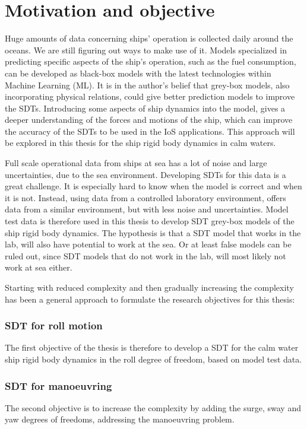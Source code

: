 \section{Motivation and objective}
\label{sec:motivation}
Huge amounts of data concerning ships' operation is collected daily around the oceans. We are still figuring out ways to make use of it. Models specialized in predicting specific aspects of the ship's operation, such as the fuel consumption, can be developed as black-box models with the latest technologies within Machine Learning (ML). It is in the author's belief that grey-box models, also incorporating physical relations, could give better prediction models to improve the SDTs. Introducing some aspects of ship dynamics into the model, gives a deeper understanding of the forces and motions of the ship, which can improve the accuracy of the SDTs to be used in the IoS applications. This approach will be explored in this thesis for the ship rigid body dynamics in calm waters.

Full scale operational data from ships at sea has a lot of noise and large uncertainties, due to the sea environment. Developing SDTs for this data is a great challenge. It is especially hard to know when the model is correct and when it is not. Instead, using data from a controlled laboratory environment, offers data from a similar environment, but with less noise and uncertainties. 
Model test data is therefore used in this thesis to develop SDT grey-box models of the ship rigid body dynamics. The hypothesis is that a SDT model that works in the lab, will also have potential to work at the sea. Or at least false models can be ruled out, since SDT models that do not work in the lab, will most likely not work at sea either. 

\bigskip
\noindent Starting with reduced complexity and then gradually increasing the complexity has been a general approach to formulate the research objectives for this thesis:   


\subsubsection*{SDT for roll motion}
The first objective of the thesis is therefore to develop a SDT for the calm water ship rigid body dynamics in the roll degree of freedom, based on model test data.

\subsubsection*{SDT for manoeuvring}
The second objective is to increase the complexity by adding the surge, sway and yaw degrees of freedoms, addressing the manoeuvring problem.

